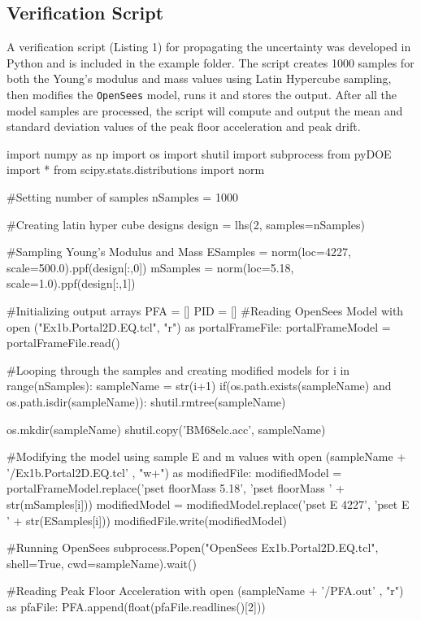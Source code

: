 \subsection{Verification Script}
A verification script (Listing 1) for propagating the uncertainty was
developed in Python and is included in the example folder.  The script
creates 1000 samples for both the Young’s modulus and mass values
using Latin Hypercube sampling, then modifies the \texttt{OpenSees}
model, runs it and stores the output.  After all the model samples are
processed, the script will compute and output the mean and standard
deviation values of the peak floor acceleration and peak drift.

\begin{python}[caption=Python script for analyzing the portal frame model with uncertain parameters]
import numpy as np
import os
import shutil
import subprocess
from pyDOE import *
from scipy.stats.distributions import norm

#Setting number of samples
nSamples = 1000

#Creating latin hyper cube designs
design = lhs(2, samples=nSamples)

#Sampling Young's Modulus and Mass
ESamples = norm(loc=4227, scale=500.0).ppf(design[:,0])
mSamples = norm(loc=5.18, scale=1.0).ppf(design[:,1])

#Initializing output arrays
PFA = []
PID = []
#Reading OpenSees Model
with open ("Ex1b.Portal2D.EQ.tcl", "r") as portalFrameFile:
    portalFrameModel = portalFrameFile.read()

    #Looping through the samples and creating modified models
    for i in range(nSamples):
        sampleName = str(i+1)
        if(os.path.exists(sampleName) and os.path.isdir(sampleName)):
            shutil.rmtree(sampleName)

        os.mkdir(sampleName)
        shutil.copy('BM68elc.acc', sampleName)

        #Modifying the model using sample E and m values
        with open (sampleName + '/Ex1b.Portal2D.EQ.tcl' , "w+") as modifiedFile:
            modifiedModel = portalFrameModel.replace('pset floorMass 5.18', 'pset floorMass ' + str(mSamples[i]))
            modifiedModel = modifiedModel.replace('pset E 4227', 'pset E ' + str(ESamples[i]))
            modifiedFile.write(modifiedModel)

        #Running OpenSees
        subprocess.Popen("OpenSees Ex1b.Portal2D.EQ.tcl", shell=True, cwd=sampleName).wait()

        #Reading Peak Floor Acceleration
        with open (sampleName + '/PFA.out' , "r") as pfaFile:
            PFA.append(float(pfaFile.readlines()[2]))


\end{python}
